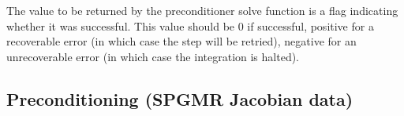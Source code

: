 {
  The value to be returned by the preconditioner solve function is a flag
  indicating whether it was successful.  This value should be $0$ if successful, 
  positive for a recoverable error (in which case the step will be retried),     
  negative for an unrecoverable error (in which case the integration is halted). 
}
{}

\subsection{Preconditioning (SPGMR Jacobian data)}\label{ss:precondFn}

